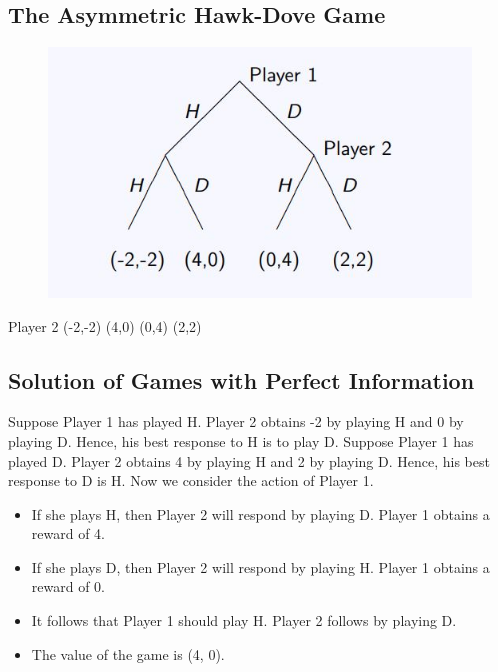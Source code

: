 \documentclass[]{report}
\begin{document}
\subsection{The Asymmetric Hawk-Dove Game}



\begin{figure}
\centering
\includegraphics[width=0.7\linewidth]{images/DR5-Slide36}
\caption{}
\label{fig:DR5-Slide36}
\end{figure}

Player 2
(-2,-2) (4,0) (0,4) (2,2)

\subsection{Solution of Games with Perfect Information}
Suppose Player 1 has played H. Player 2 obtains -2 by playing H
and 0 by playing D. Hence, his best response to H is to play D.
Suppose Player 1 has played D. Player 2 obtains 4 by playing H
and 2 by playing D. Hence, his best response to D is H.
Now we consider the action of Player 1.

\begin{itemize}
	\item If she plays H, then Player 2 will respond by playing D. Player 1
	obtains a reward of 4.
	\item 	If she plays D, then Player 2 will respond by playing H. Player 1
	obtains a reward of 0.
	\item 	It follows that Player 1 should play H. Player 2 follows by playing
	D.
	\item 	The value of the game is (4, 0).
	
\end{itemize}
\end{document}
